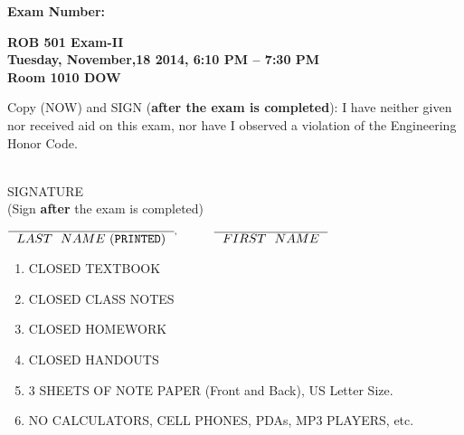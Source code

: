 \documentclass[letterpaper]{article}
\newcommand{\bline}[1]{\underline{\hspace*{#1}}}
\begin{document}


\begin{flushright}
{\bf Exam Number:}\bline{0.6in}
\end{flushright}

\vspace*{.1in}
\begin{center}
\LARGE \bf
ROB 501 Exam-II \\
\large
Tuesday, November,18 2014, 6:10 PM -- 7:30 PM \\
Room 1010 DOW \\ %
\end{center}

\vspace*{1in}

 Copy (NOW) and SIGN ({\bf after the exam is completed}): I have neither given nor received aid on this exam, nor have I observed a violation of the
Engineering Honor Code.

\vspace*{1in}
\begin{flushright}
\underline{\hspace*{2.5in}} \\
SIGNATURE \\
(Sign {\bf after} the exam is completed)
\end{flushright}

\vspace*{1in}

\begin{center}
$\overline{\mathrm ~~LAST~~NAME~ ({\tt PRINTED})~~}^, \hspace*{.4in} \overline{\mathrm ~~FIRST~~NAME~~}$ \\

\end{center}

\vspace*{.45in} 
\begin{enumerate}
\item CLOSED TEXTBOOK
\item CLOSED CLASS NOTES
\item CLOSED HOMEWORK
\item CLOSED HANDOUTS
\item 3  SHEETS OF NOTE PAPER (Front and Back), US Letter Size.
\item NO CALCULATORS, CELL PHONES, PDAs, MP3 PLAYERS, etc.
\end{enumerate}
\vspace*{.4in}
\end{document}
